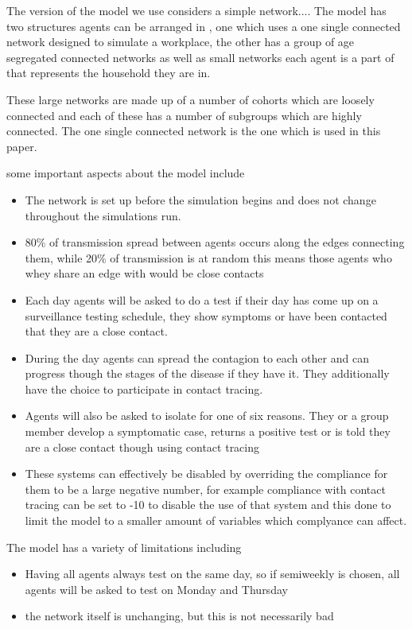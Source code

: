 \documentclass{article}
\begin{document}
The version of the model we use considers a simple network.... The model has two structures agents can be arranged in , one which uses a one single connected network designed to simulate a workplace, the other has a group of age segregated connected networks as well as small networks each agent is a part of that represents the household they are in. 

These large networks are made up of a number of cohorts which are loosely connected and each of these has a number of subgroups which are highly connected. The one single connected network is the one which is used in this paper.

some important aspects about the model include
\begin{itemize}

\item The network is set up before the simulation begins and does not change throughout the simulations run. 

\item 80\% of transmission spread between agents occurs along the edges connecting them, while 20\% of transmission is at  random this means those agents who whey share an edge with would be close contacts

\item Each day agents will be asked to do a test if their day has come up on a surveillance testing schedule, they show symptoms or have been contacted that they are a close contact.

\item During the day agents can spread the contagion to each other and can progress though the stages of the disease if they have it. They additionally have the choice to participate in contact tracing.

\item Agents will also be asked to isolate for one of six reasons. They or a group member develop a symptomatic case, returns a positive test or is told they are a close contact though using contact tracing

\item These systems can effectively be disabled by overriding the compliance for them to be a large negative number, for example compliance with contact tracing can be set to -10 to disable the use of that system and this done to limit the model to a smaller amount of variables which complyance can affect.
\end{itemize}


The model has a variety of limitations including 
\begin{itemize}
\item Having all agents always test on the same day, so if semiweekly is chosen, all agents will be asked to test on Monday and Thursday
\item the network itself is unchanging, but this is not necessarily bad
\end{itemize}
\end{document}
